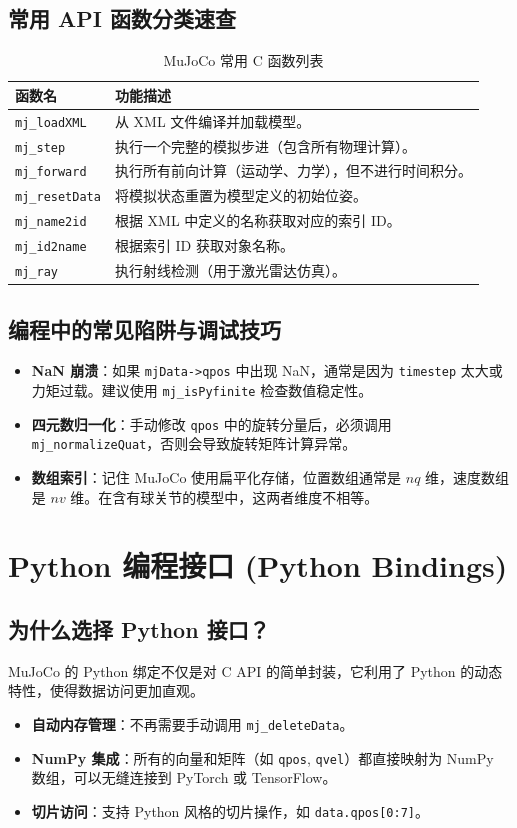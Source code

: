 \documentclass[11pt,a4paper]{book}
\begin{document}
\section{常用 API 函数分类速查}

\begin{longtable}{lp{12cm}}
\caption{MuJoCo 常用 C 函数列表} \\
\toprule
\textbf{函数名} & \textbf{功能描述} \\ \midrule
\texttt{mj\_loadXML} & 从 XML 文件编译并加载模型。 \\
\texttt{mj\_step} & 执行一个完整的模拟步进（包含所有物理计算）。 \\
\texttt{mj\_forward} & 执行所有前向计算（运动学、力学），但不进行时间积分。 \\
\texttt{mj\_resetData} & 将模拟状态重置为模型定义的初始位姿。 \\
\texttt{mj\_name2id} & 根据 XML 中定义的名称获取对应的索引 ID。 \\
\texttt{mj\_id2name} & 根据索引 ID 获取对象名称。 \\
\texttt{mj\_ray} & 执行射线检测（用于激光雷达仿真）。 \\
\bottomrule
\end{longtable}

\section{编程中的常见陷阱与调试技巧}
\begin{itemize}
    \item \textbf{NaN 崩溃}：如果 \texttt{mjData->qpos} 中出现 NaN，通常是因为 \texttt{timestep} 太大或力矩过载。建议使用 \texttt{mj\_isPyfinite} 检查数值稳定性。
    \item \textbf{四元数归一化}：手动修改 \texttt{qpos} 中的旋转分量后，必须调用 \texttt{mj\_normalizeQuat}，否则会导致旋转矩阵计算异常。
    \item \textbf{数组索引}：记住 MuJoCo 使用扁平化存储，位置数组通常是 $nq$ 维，速度数组是 $nv$ 维。在含有球关节的模型中，这两者维度不相等。
\end{itemize}


\chapter{Python 编程接口 (Python Bindings)}

\section{为什么选择 Python 接口？}
MuJoCo 的 Python 绑定不仅是对 C API 的简单封装，它利用了 Python 的动态特性，使得数据访问更加直观。
\begin{itemize}
    \item \textbf{自动内存管理}：不再需要手动调用 \texttt{mj\_deleteData}。
    \item \textbf{NumPy 集成}：所有的向量和矩阵（如 \texttt{qpos}, \texttt{qvel}）都直接映射为 NumPy 数组，可以无缝连接到 PyTorch 或 TensorFlow。
    \item \textbf{切片访问}：支持 Python 风格的切片操作，如 \texttt{data.qpos[0:7]}。
\end{itemize}
\end{document}
